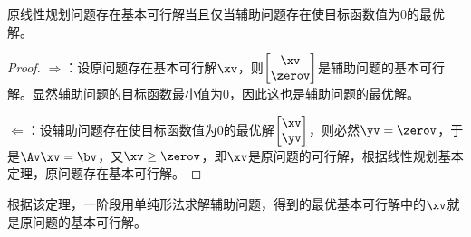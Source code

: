 \documentclass{ctexart}
\begin{document}
\begin{theorem}
    原线性规划问题存在基本可行解当且仅当辅助问题存在使目标函数值为$0$的最优解。
\end{theorem}

\begin{proof}
    $\Rightarrow$：设原问题存在基本可行解$\xv$，则$\begin{bmatrix}
            \xv \\ \zerov
        \end{bmatrix}$是辅助问题的基本可行解。显然辅助问题的目标函数最小值为$0$，因此这也是辅助问题的最优解。

    $\Leftarrow$：设辅助问题存在使目标函数值为$0$的最优解$\begin{bmatrix}
            \xv \\ \yv
        \end{bmatrix}$，则必然$\yv = \zerov$，于是$\Av \xv = \bv$，又$\xv \ge \zerov$，即$\xv$是原问题的可行解，根据线性规划基本定理，原问题存在基本可行解。
\end{proof}

根据该定理，一阶段用单纯形法求解辅助问题，得到的最优基本可行解中的$\xv$就是原问题的基本可行解。
\end{document}
